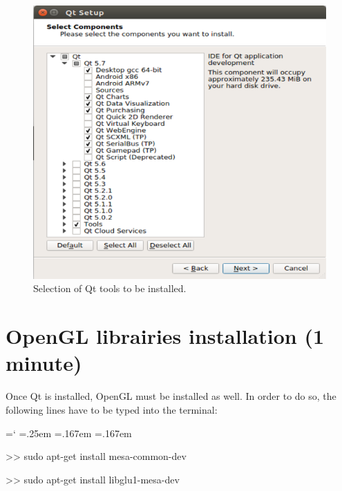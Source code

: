 \documentclass[12pt]{report}
\DeclareRobustCommand*{\ttfamily}{
  \origttfamily
  \hyphenchar\font=`\-\relax
  \fontdimen3\font=.25em\relax
  \fontdimen4\font=.167em\relax
  \fontdimen7\font=.167em\relax
}
\newenvironment{code}{\ttfamily}{}
\begin{document}
\begin{enumerate}
\vspace{10pt}
\begin{figure}[H]
\centerline{\includegraphics[scale = 0.5]{img/Qt-install-3.png}}
\caption{Selection of Qt tools to be installed.}
\label{qt-install-3}
\end{figure}
\end{enumerate}
\vspace{10pt}

\section{OpenGL librairies installation (1 minute)}
	Once Qt is installed, OpenGL must be installed as well. In order to do so, the following lines have to be typed into the terminal:

\begin{code}
>> sudo apt-get install mesa-common-dev

>> sudo apt-get install libglu1-mesa-dev
\end{code}
\end{document}
